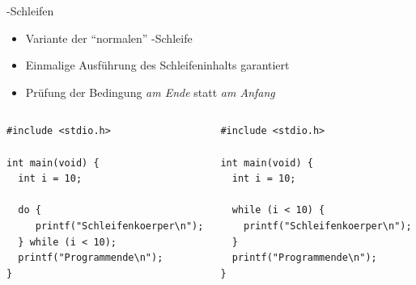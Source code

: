 
\begin{frame}[fragile]{-Schleifen}
%
\begin{itemize}
\item Variante der \enquote{normalen} -Schleife
\item Einmalige Ausführung des Schleifeninhalts garantiert
\item Prüfung der Bedingung \emph{am Ende} statt \emph{am Anfang}
\end{itemize}
%
\begin{columns}[T]
\begin{codebox}
\begin{verbatim}
#include <stdio.h>

int main(void) {
  int i = 10;
  
  do {
     printf("Schleifenkoerper\n");
  } while (i < 10);
  printf("Programmende\n");
}
\end{verbatim}
%
\end{codebox}
%
\begin{codebox}
\begin{verbatim}
#include <stdio.h>

int main(void) {
  int i = 10;

  while (i < 10) {
    printf("Schleifenkoerper\n");
  }
  printf("Programmende\n");
}
\end{verbatim}
\end{codebox}
\end{columns}
%
\end{frame}


